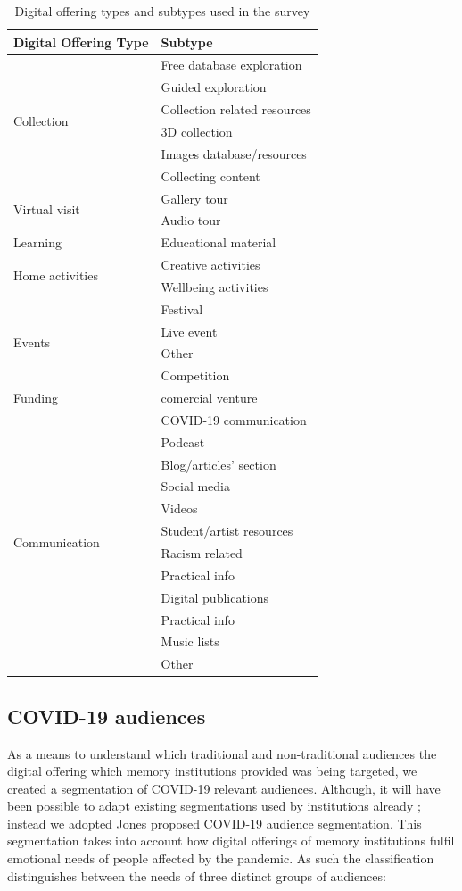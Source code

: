 \documentclass{egpubl}
\begin{document}
\begin{table}
\begin{tabular}
{ | l | l | }
    \hline
    \textbf{Digital Offering Type}  & \textbf{Subtype}  \\
    \hline
  \multirow{6}{*}{Collection} & Free database exploration  \\
&  Guided exploration  \\
&  Collection related resources \\
&  3D collection \\
&  Images database/resources \\
&  Collecting content \\
    \hline
 \multirow{2}{*}{Virtual visit} & Gallery tour  \\
&  Audio tour  \\
    \hline
 Learning & Educational material  \\
    \hline
 \multirow{2}{*}{Home activities} & Creative activities \\
&  Wellbeing activities  \\
    \hline
 \multirow{4}{*}{Events} & Festival\\
&  Live event \\
&  Other \\
&  Competition \\
    \hline
 Funding & comercial venture \\
    \hline
 \multirow{12}{*}{Communication} & COVID-19 communication \\
& Podcast \\
& Blog/articles' section \\
& Social media  \\
& Videos \\
& Student/artist resources \\
& Racism related \\
& Practical info \\
& Digital publications \\
& Practical info \\
& Music lists \\
& Other \\
    \hline
\end{tabular}
\caption{\label{tab:digoffer}Digital offering types and subtypes used in the survey}
\end{table}

\subsection{COVID-19 audiences}
\label{covaud}
As a means to understand which traditional and non-traditional audiences the digital offering which memory institutions provided was being targeted, we created a segmentation of COVID-19 relevant audiences. Although, it will have been possible to adapt existing segmentations used by institutions already \cite{Drot19}; instead we adopted Jones \cite{Audiences2020} proposed COVID-19 audience segmentation. This segmentation takes into account how digital offerings of memory institutions fulfil emotional needs of people affected by the pandemic. As such the classification distinguishes between the needs of three distinct groups of audiences: 
\end{document}
